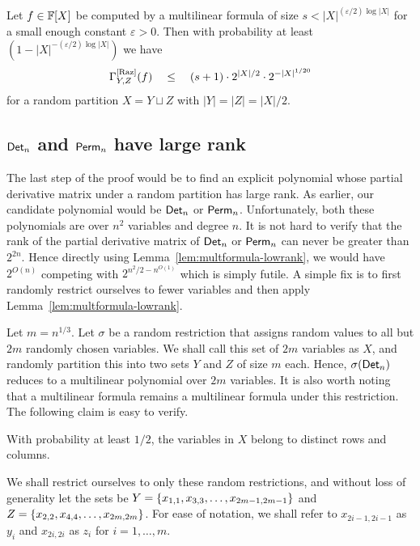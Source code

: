 \documentclass[12pt]{report}
\newcommand{\CM}[1]{\Gamma^{\mathrm{[#1]}}}
\renewcommand{\epsilon}{\varepsilon}
\begin{document}
\begin{lemma}\label{lem:multformula-lowrank}
  Let $f \in \mathbb{F}[X]$ be computed by a multilinear formula of size $s < |X|^{(\epsilon/2) \log |X|}$ for a small enough constant $\epsilon > 0$. Then with probability at least $(1 - |X|^{-(\epsilon/2)\log |X|})$ we have $$\CM{Raz}_{Y,Z}(f) \spaced{\leq} (s+1)\cdot 2^{|X|/2} \cdot 2^{-|X|^{1/20}}$$ for a random partition $X = Y \sqcup Z$ with $|Y| = |Z| = |X|/2$.
\end{lemma}

\subsection{$\mathsf{Det}_n$ and $\mathsf{Perm}_n$ have large rank}

The last step of the proof would be to find an explicit polynomial whose partial derivative matrix under a random partition has large rank. As earlier, our candidate polynomial would be $\mathsf{Det}_n$ or $\mathsf{Perm}_n$. Unfortunately, both these polynomials are over $n^2$ variables and degree $n$. It is not hard to verify that the rank of the partial derivative matrix of $\mathsf{Det}_n$ or $\mathsf{Perm}_n$ can never be greater than $2^{2n}$. Hence directly using Lemma~\ref{lem:multformula-lowrank}, we would have $2^{O(n)}$ competing with $2^{n^2/2 - n^{O(1)}}$ which is simply futile. A simple fix is to first randomly restrict ourselves to fewer variables and then apply Lemma~\ref{lem:multformula-lowrank}. 

Let $m = n^{1/3}$. Let $\sigma$ be a random restriction that assigns random values to all but $2m$ randomly chosen variables. We shall call this set of $2m$ variables as $X$, and randomly partition this into two sets $Y$ and $Z$ of size $m$ each. Hence, $\sigma(\mathsf{Det}_n)$ reduces to a multilinear polynomial over $2m$ variables. It is also worth noting that a multilinear formula remains a multilinear formula under this restriction. The following claim is easy to verify. 

\begin{claim}
With probability at least $1/2$, the variables in $X$ belong to distinct rows and columns. 
\end{claim}

We shall restrict ourselves to only these random restrictions, and without loss of generality let the sets be $Y = \left\{x_{1,1},x_{3,3},\dots,x_{2m-1,2m-1}\right\}$ and $Z = \left\{x_{2,2},x_{4,4},\dots, x_{2m,2m}\right\}$. For ease of notation, we shall refer to $x_{2i-1,2i-1}$ as $y_i$ and $x_{2i,2i}$ as $z_i$ for $i = 1,\dots, m$. 
\end{document}
